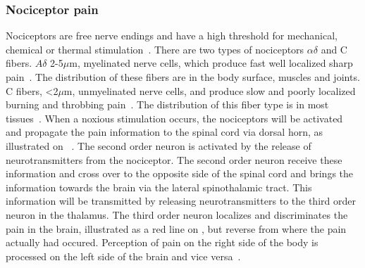 \subsubsection{Nociceptor pain}
Nociceptors are free nerve endings and have a high threshold for mechanical, chemical or thermal stimulation~\cite{Steeds2013}. There are two types of nociceptors $\alpha\delta$ and C fibers. $A\delta$  %
2-5$\mu$m, myelinated nerve cells, which produce fast well localized sharp pain~\cite{Steeds2013}. The distribution of these fibers are in the body surface, muscles and joints. C fibers, <2$\mu$m, unmyelinated nerve cells, and produce slow and poorly localized burning and throbbing pain~\cite{Steeds2013}. The distribution of this fiber type is in most tissues~\cite{Steeds2013}. 
When a noxious stimulation occurs, the nociceptors will be activated and propagate the pain information to the spinal cord via dorsal horn, as illustrated on ~\cite{Martini2012}. The second order neuron is activated by the release of neurotransmitters from the nociceptor. The second order neuron receive these information and cross over to the opposite side of the spinal cord and brings the information towards the brain via the lateral spinothalamic tract. This information will be transmitted by releasing neurotransmitters to the third order neuron in the thalamus. The third order neuron localizes and discriminates the pain in the brain, illustrated as a red line on , but reverse from where the pain actually had occured. Perception of pain on the right side of the body is processed on the left side of the brain and vice versa~\cite{Martini2012}. 


